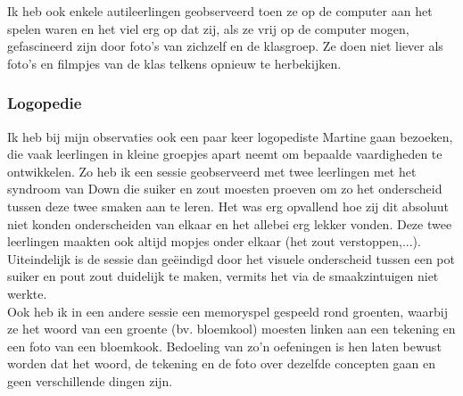 \documentclass[a4paper,11pt]{article}
\theoremstyle{definition}
\begin{document}
\noindent Ik heb ook enkele autileerlingen geobserveerd toen ze op de computer 
aan het spelen waren en het viel erg op dat zij, als ze vrij op de computer 
mogen, gefascineerd zijn door foto's van zichzelf en de klasgroep. Ze doen niet 
liever als foto's en filmpjes van de klas telkens opnieuw te herbekijken.

\subsubsection{Logopedie}
Ik heb bij mijn observaties ook een paar keer logopediste Martine gaan bezoeken, 
die vaak leerlingen in kleine groepjes apart neemt om bepaalde vaardigheden te 
ontwikkelen. Zo heb ik een sessie geobserveerd met twee leerlingen met het 
syndroom van Down die suiker en zout moesten proeven om zo het onderscheid 
tussen deze twee smaken aan te leren. Het was erg opvallend hoe zij dit absoluut 
niet konden onderscheiden van elkaar en het allebei erg lekker vonden. Deze twee 
leerlingen maakten ook altijd mopjes onder elkaar (het zout verstoppen,...).
Uiteindelijk is de sessie dan geëindigd door het visuele onderscheid tussen een 
pot suiker en pout zout duidelijk te maken, vermits het via de smaakzintuigen 
niet werkte.\\


\noindent Ook heb ik in een andere sessie een memoryspel gespeeld rond 
groenten, waarbij ze het woord van een groente (bv. bloemkool) moesten linken aan een tekening en een foto van 
een bloemkook. Bedoeling van zo'n oefeningen is hen laten bewust worden dat het 
woord, de tekening en de foto over dezelfde concepten gaan en geen verschillende 
dingen zijn.
\end{document}
